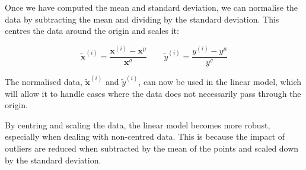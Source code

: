 Once we have computed the mean and standard deviation, we can normalise the data by subtracting the mean and dividing by the standard deviation. This centres the data around the origin and scales it:

\begin{equation}
    \tilde{\bm{x}}^{(i)} = \frac{\bm{x}^{(i)} - \bm{x}^{\mu}}{\bm{x}^{\sigma}}\quad\quad\tilde{y}^{(i)} = \frac{y^{(i)} - y^{\mu}}{y^{\sigma}}
\end{equation}

The normalised data, $\tilde{\bm{x}}^{(i)}$ and $\tilde{y}^{(i)}$, can now be used in the linear model, which will allow it to handle cases where the data does not necessarily pass through the origin. \bigskip

By centring and scaling the data, the linear model becomes more robust, especially when dealing with non-centred data. This is because the impact of outliers are reduced when subtracted by the mean of the points and scaled down by the standard deviation.


